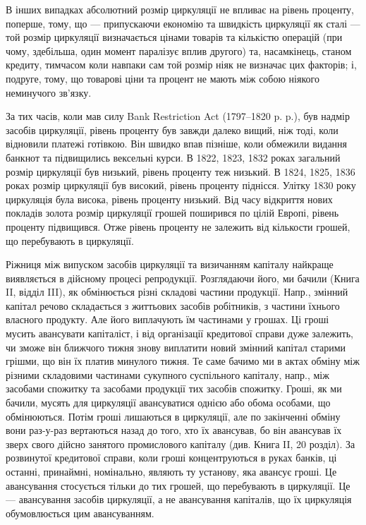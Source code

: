 
В інших випадках абсолютний розмір циркуляції не впливає на рівень
проценту, поперше, тому, що — припускаючи економію та швидкість циркуляції
як сталі — той розмір циркуляції визначається цінами товарів та кількістю операцій
(при чому, здебільша, один момент паралізує вплив другого) та, насамкінець,
станом кредиту, тимчасом коли навпаки сам той розмір ніяк не визначає
цих факторів; і, подруге, тому, що товарові ціни та процент не мають між собою
ніякого неминучого зв’язку.

За тих часів, коли мав силу Bank Restriction Act (1797--1820 p. p.),
був надмір засобів циркуляції, рівень проценту був завжди далеко вищий, ніж
тоді, коли відновили платежі готівкою. Він швидко впав пізніше, коли обмежили
видання банкнот та підвищились вексельні курси. В 1822, 1823, 1832 роках
загальний розмір циркуляції був низький, рівень проценту теж низький. В 1824,
1825, 1836 роках розмір циркуляції був високий, рівень проценту піднісся.
Улітку 1830 року циркуляція була висока, рівень проценту низький. Від часу
відкриття нових покладів золота розмір циркуляції грошей поширився по цілій
Европі, рівень проценту підвищився. Отже рівень проценту не залежить від
кількости грошей, що перебувають в циркуляції.

Ріжниця між випуском засобів циркуляції та визичанням капіталу найкраще
виявляється в дійсному процесі репродукції. Розглядаючи його, ми бачили (Книга II,
відділ III), як обмінюється різні складові частини продукції. Напр., змінний капітал
речово складається з життьових засобів робітників, з частини їхнього власного
продукту. Але його виплачують їм частинами у грошах. Ці гроші мусить
авансувати капіталіст, і від організації кредитової справи дуже залежить, чи
зможе він ближчого тижня знову виплатити новий змінний капітал старими
грішми, що він їх платив минулого тижня. Те саме бачимо ми в актах обміну
між різними складовими частинами сукупного суспільного капіталу, напр., між
засобами спожитку та засобами продукції тих засобів спожитку. Гроші, як ми
бачили, мусять для циркуляції авансуватися однією або обома особами, що обмінюються.
Потім гроші лишаються в циркуляції, але по закінченні обміну вони
раз-у-раз вертаються назад до того, хто їх авансував, бо він авансував їх зверх
свого дійсно занятого промислового капіталу (див. Книга II, 20 розділ). За розвинутої
кредитової справи, коли гроші концентруються в руках банків, ці останні,
принаймні, номінально, являють ту установу, яка авансує гроші. Це авансування
стосується тільки до тих грошей, що перебувають в циркуляції. Це — авансування
засобів циркуляції, а не авансування капіталів, що їх циркуляція обумовлюється
цим авансуванням.

